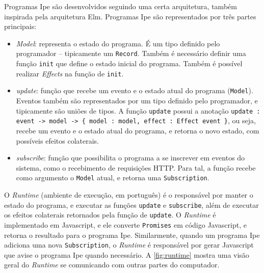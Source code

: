 Programas Ipe são desenvolvidos seguindo uma certa arquitetura, também inspirada
pela arquitetura Elm. Programas Ipe são representados por três partes principais:

\begin{itemize}
    \item \textit{Model}: representa o estado do programa. É um tipo definido
          pelo programador -- tipicamente um \texttt{Record}. Também é necessário definir
          uma função \texttt{init} que define o estado inicial do programa. Também
          é possível realizar \textit{Effects} na função de \texttt{init}.
    \item \textit{update}: função que recebe um evento e o estado atual do programa
          (\texttt{Model}). Eventos também são representados por um tipo definido pelo
          programador, e tipicamente são uniões de tipos. A função \texttt{update} possui
          a anotação \texttt{update : event -> model -> \{ model : model, effect : Effect event \}},
          ou seja, recebe um evento e o estado atual do programa, e retorna o novo estado,
          com possíveis efeitos colaterais.
    \item \textit{subscribe}: função que possibilita o programa a se inscrever
          em eventos do sistema, como o recebimento de requisições HTTP. Para tal,
          a função recebe como argumento o \texttt{Model} atual, e retorna uma
          \texttt{Subscription}.
\end{itemize}

O \textit{Runtime} (ambiente de execução, em português) é o responsável por manter
o estado do programa, e executar as funções \texttt{update} e \texttt{subscribe},
além de executar os efeitos colaterais retornados pela função de \texttt{update}.
O \textit{Runtime} é implementado em Javascript, e ele converte \texttt{Promises} em
código Javascript, e retorna o resultado para o programa Ipe.  Similarmente, quando
um programa Ipe adiciona uma nova \texttt{Subscription}, o \textit{Runtime} é
responsável por gerar Javascript que avise o programa Ipe quando necessário. A
\autoref{fig:runtime} mostra uma visão geral do \textit{Runtime} se comunicando
com outras partes do computador.


